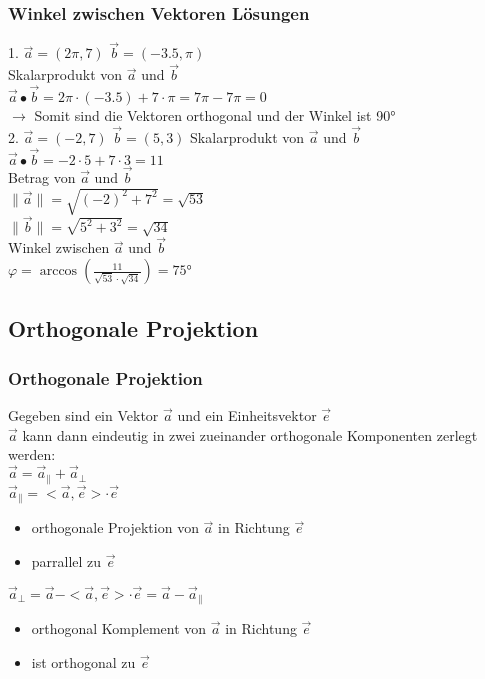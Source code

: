\begin{frame}
	\frametitle{Winkel zwischen Vektoren Lösungen}
	1. $\vec{a} = (2\pi, 7)$ $\vec{b} = (-3.5, \pi)$ \\
	Skalarprodukt von $\vec{a}$ und $\vec{b}$ \\
	$\vec{a} \bullet \vec{b} = 2\pi \cdot (-3.5) + 7 \cdot \pi = 7\pi - 7\pi = 0$ \\
	$\rightarrow$ Somit sind die Vektoren orthogonal und der Winkel ist 90° \\
	$ $ \\
	2. $\vec{a} = (-2, 7)$ $\vec{b} = (5, 3)$
	Skalarprodukt von $\vec{a}$ und $\vec{b}$ \\
	$\vec{a} \bullet \vec{b} = -2 \cdot 5 + 7 \cdot 3 = 11$ \\
	Betrag von $\vec{a}$ und $\vec{b}$ \\
	$\lVert \vec{a} \rVert = \sqrt{(-2)^2 + 7^2} = \sqrt{53}$ \\
	$\lVert \vec{b} \rVert = \sqrt{5^2 + 3^2} = \sqrt{34}$ \\
	Winkel zwischen $\vec{a}$ und $\vec{b}$ \\
	$\varphi = \arccos(\frac{11}{\sqrt{53} \cdot \sqrt{34}}) = 75$°
\end{frame}
		
\subsection{Orthogonale Projektion}
\begin{frame}
	\frametitle{Orthogonale Projektion}
	Gegeben sind ein Vektor $\vec{a}$ und ein Einheitsvektor $\vec{e}$\\
	$\vec{a}$ kann dann eindeutig in zwei zueinander orthogonale Komponenten zerlegt werden:\\
	$\vec{a} = \vec{a}_{\parallel} + \vec{a}_{\perp}$ \\
	$ $\\
	$\vec{a}_{\parallel} = < \vec{a}, \vec{e}> \cdot \vec{e}$ \\
	\begin{itemize}
		\item orthogonale Projektion von $\vec{a}$ in Richtung $\vec{e}$ 
		\item parrallel zu $\vec{e}$
	\end{itemize}
	$\vec{a}_{\perp} = \vec{a} - <\vec{a}, \vec{e}> \cdot \vec{e} = \vec{a} - \vec{a}_{\parallel}$
	\begin{itemize}
		\item orthogonal Komplement von $\vec{a}$ in Richtung $\vec{e}$
		\item ist orthogonal zu $\vec{e}$
	\end{itemize}
\end{frame}

